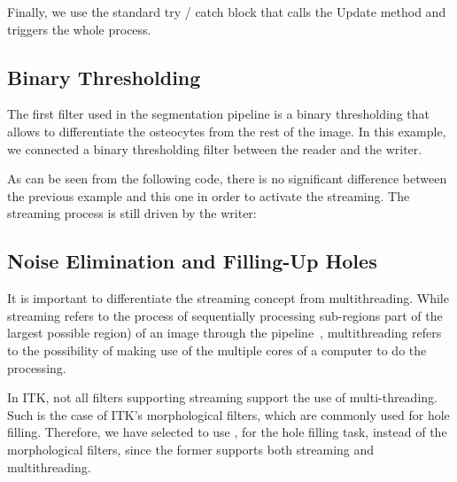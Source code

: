 \documentclass{InsightArticle}
\begin{document}
\begin{center}

\end{center}

Finally, we use the standard try / catch block that calls the Update method and
triggers the whole process.

\begin{center}

\end{center}

\subsection{Binary Thresholding}
The first filter used in the segmentation pipeline is a binary thresholding that
allows to differentiate the osteocytes from the rest of the image. In this example,
we connected a binary thresholding filter between the reader and the writer.

\begin{center}

\end{center}

As can be seen from the following code, there is no significant difference
between the previous example and this one in order to activate the streaming.
The streaming process is still driven by the writer:

\begin{center}

\end{center}

\subsection{Noise Elimination and Filling-Up Holes}
It is important to differentiate the streaming concept from multithreading. While
streaming refers to the process of sequentially processing sub-regions part of
the largest possible region) of an image through the pipeline~\cite{Lowekamp2010},
multithreading refers to the possibility of making use of the multiple cores of
a computer to do the processing.

In ITK, not all filters supporting streaming support the use of multi-threading.
Such is the case of ITK's morphological filters, which are commonly used for hole
filling. Therefore, we have selected to use ,
for the hole filling task, instead of the morphological filters, since the former
supports both streaming and multithreading.
\end{document}
